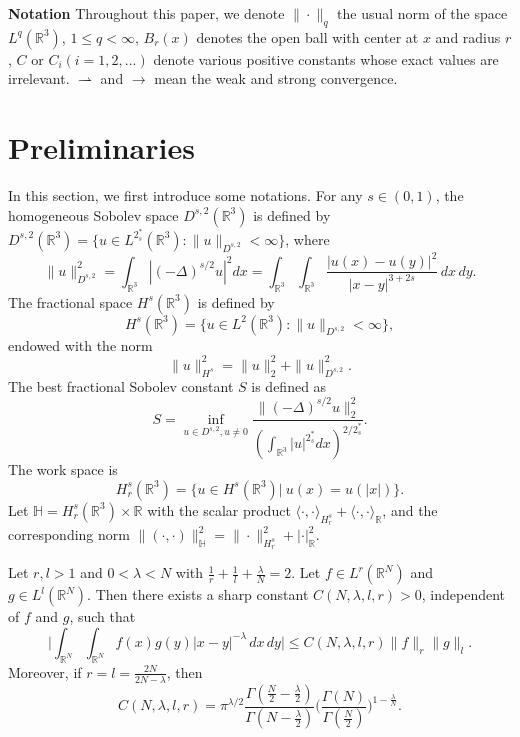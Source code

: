 \documentclass[reqno]{amsart}
\begin{document}
\noindent\textbf{Notation}
Throughout this paper, we denote $\|\cdot\|_q$ the usual norm of the  space
$L^q(\mathbb{R}^3)$, $1\leq q <\infty$, $B_r(x)$ denotes the open ball with center at
$x$ and radius $r$, $C$ or $C_i (i=1,2,...)$ denote various positive constants whose
exact values are irrelevant. $\rightharpoonup$ and $\to$ mean the weak and strong
convergence.

\section{Preliminaries}

In this section, we first introduce  some  notations. For any $s\in(0,1)$, the
homogeneous Sobolev space $D^{s,2}(\mathbb{R}^3)$ is defined by
$D^{s,2}(\mathbb{R}^3)=\{u\in L^{2^*_s}(\mathbb{R}^3):\|u\|_{D^{s,2}}<\infty\}$,
where
$$
\|u\|^2_{D^{s,2}}=\int_{\mathbb{R}^3}|(-\Delta)^{s/2}u|^2dx
=\int_{\mathbb{R}^3}\int_{\mathbb{R}^3}\frac{|u(x)-u(y)|^2}{|x-y|^{3+2s}}\,dx\,dy.
$$
The fractional space $H^s(\mathbb{R}^3)$ is defined by
$$
H^s(\mathbb{R}^3)=\{u\in L^2(\mathbb{R}^3): \|u\|_{D^{s,2}}< \infty \},
$$
endowed with the norm
$$
\|u\|^2_{H^s}=\|u\|^2_2+\|u\|^2_{D^{s,2}}.
$$
The best fractional Sobolev constant $S$ is defined as
\begin{equation}\label{2.111}
S=\inf_{u\in D^{s,2}, u\neq 0}
\frac{\|(-\Delta)^{s/2}u\|^2_2}
{(\int_{\mathbb{R}^3}|u|^{2^*_s}dx)^{2/2^*_s}}.
\end{equation}
The work space is
 $$
 H^s_r(\mathbb{R}^3)=\{u \in H^s(\mathbb{R}^3)|~ u(x)=u(|x|)\}.
 $$
Let $\mathbb{H}=H^s_r(\mathbb{R}^3) \times \mathbb{R}$ with the scalar product
$\langle\cdot, \cdot\rangle_{H^s_r}+\langle\cdot, \cdot\rangle_{\mathbb{R}}$, and
the corresponding norm
$\|(\cdot, \cdot)\|^2_\mathbb{H}=\|\cdot\|^2_{H^s_r}+|\cdot|^2_{\mathbb{R}}$.

\begin{proposition} \label{pro2.1}
Let $r,l>1$ and $0<\lambda <N$ with $\frac{1}{r}+\frac{1}{l}+\frac{\lambda}{N}=2$.
Let $f\in L^r(\mathbb{R}^N)$ and $g\in L^l(\mathbb{R}^N)$.
Then there exists a sharp constant $C(N, \lambda, l, r)>0$, independent of $f$ and $g$,
such that
\[
\Big|\int_{\mathbb{R}^N}\int_{\mathbb{R}^N}f(x)g(y)|x-y|^{-\lambda}\,dx\,dy\Big|
\leq C(N, \lambda, l, r)\|f\|_{r}\|g\|_{l}.
\]
Moreover, if $r=l=\frac{2N}{2N-\lambda}$, then
\[
C(N, \lambda, l, r)
=\pi^{\lambda/2}\frac{\Gamma(\frac{N}{2}-\frac{\lambda}{2})}
{\Gamma(N-\frac{\lambda}{2})}\Big(\frac{\Gamma(N)}{\Gamma(\frac{N}{2})}
\Big)^{1-\frac{\lambda}{N}}.
\]
\end{proposition}
\end{document}
